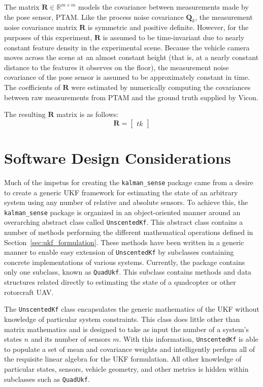 The matrix $\mathbf{R} \in \mathbb{R}^{m \times m}$ models the covariance between measurements made by the pose sensor, PTAM. Like the process noise covariance $\mathbf{Q}_{k}$, the measurement noise covariance matrix $\mathbf{R}$ is symmetric and positive definite. However, for the purposes of this experiment, $\mathbf{R}$ is assumed to be time-invariant due to nearly constant feature density in the experimental scene. Because the vehicle camera moves across the scene at an almost constant height (that is, at a nearly constant distance to the features it observes on the floor), the measurement noise covariance of the pose sensor is assumed to be approximately constant in time. The coefficients of $\mathbf{R}$ were estimated by numerically computing the covariances between raw measurements from PTAM and the ground truth supplied by Vicon.

The resulting $\mathbf{R}$ matrix is as follows:
%
\begin{equation}
\mathbf{R} = \begin{bmatrix}
tk
\end{bmatrix}
\end{equation}

\section{Software Design Considerations}

Much of the impetus for creating the \texttt{kalman\_sense} package came from a desire to create a generic UKF framework for estimating the state of an arbitrary system using any number of relative and absolute sensors. To achieve this, the \texttt{kalman\_sense} package is organized in an object-oriented manner around an overarching abstract class called \texttt{UnscentedKf}. This abstract class contains a number of methods performing the different mathematical operations defined in Section~\ref{sec:ukf_formulation}. These methods have been written in a generic manner to enable easy extension of \texttt{UnscentedKf} by subclasses containing concrete implementations of various systems. Currently, the package contains only one subclass, known as \texttt{QuadUkf}. This subclass contains methods and data structures related directly to estimating the state of a quadcopter or other rotorcraft UAV.

The \texttt{UnscentedKf} class encapsulates the generic mathematics of the UKF without knowledge of particular system constraints. This class does little other than matrix mathematics and is designed to take as input the number of a system's states $n$ and its number of sensors $m$. With this information, \texttt{UnscentedKf} is able to populate a set of mean and covariance weights and intelligently perform all of the requisite linear algebra for the UKF formulation. All other knowledge of particular states, sensors, vehicle geometry, and other metrics is hidden within subclasses such as \texttt{QuadUkf}.

